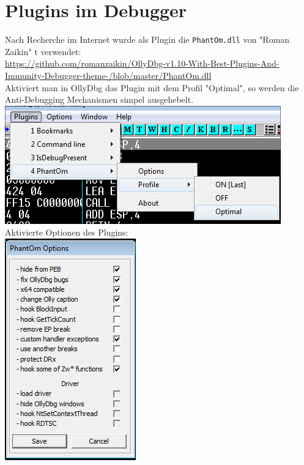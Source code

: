 \documentclass{article}
\begin{document}
	\pagebreak
	
	\section{Plugins im Debugger}
	Nach Recherche im Internet wurde als Plugin die \texttt{PhantOm.dll} von "Roman Zaikin" t verwendet:\\
	\url{https://github.com/romanzaikin/OllyDbg-v1.10-With-Best-Plugins-And-Immunity-Debugger-theme-/blob/master/PhantOm.dll}\\
	Aktiviert man in OllyDbg das Plugin mit dem Profil "Optimal", so werden die Anti-Debugging Mechanismen simpel ausgehebelt.\\
	\includegraphics[width=0.7\linewidth]{"pictures/phantom.png"}\\
	Aktivierte Optionen des Plugins:\\
	\includegraphics[width=0.2\linewidth]{"pictures/c - rev- plugin.png"}\\
	
	
	\label{LastPage}
	
\end{document}
